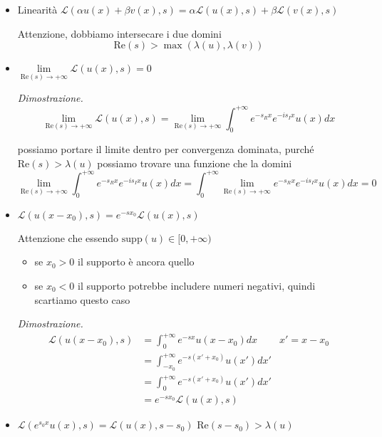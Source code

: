 \documentclass[10pt,a4paper,twoside]{book}
\begin{document}
\begin{itemize}
\item Linearità $\boxed{\mathcal{L}( \alpha u( x) +\beta v( x) ,s) =\alpha \mathcal{L}( u( x) ,s) +\beta \mathcal{L}( v( x) ,s)}$

Attenzione, dobbiamo intersecare i due domini\begin{equation*}
\boxed{\mathrm{Re}( s)  >\max( \lambda ( u) ,\lambda ( v))}
\end{equation*}
\item $\boxed{\lim\limits _{\mathrm{Re}( s)\rightarrow +\infty }\mathcal{L}( u( x) ,s) =0}$

\textit{Dimostrazione.}\begin{equation*}
\lim\limits _{\mathrm{Re}( s)\rightarrow +\infty }\mathcal{L}( u( x) ,s) =\lim\limits _{\mathrm{Re}( s)\rightarrow +\infty }\int ^{+\infty }_{0} e^{-s_{R} x} e^{-is_{I} x} u( x) dx
\end{equation*}

possiamo portare il limite dentro per convergenza dominata, purché $\mathrm{Re}( s)  >\lambda ( u)$ possiamo trovare una funzione che la domini\begin{equation*}
\lim\limits _{\mathrm{Re}( s)\rightarrow +\infty }\int ^{+\infty }_{0} e^{-s_{R} x} e^{-is_{I} x} u( x) dx=\int ^{+\infty }_{0}\lim\limits _{\mathrm{Re}( s)\rightarrow +\infty } e^{-s_{R} x} e^{-is_{I} x} u( x) dx=0
\end{equation*}
\item $\boxed{\mathcal{L}( u( x-x_{0}) ,s) =e^{-sx_{0}}\mathcal{L}( u( x) ,s)}$

Attenzione che essendo $\mathrm{supp}( u) \in [ 0,+\infty )$
\begin{itemize}
\item se $\boxed{x_{0}  >0}$ il supporto è ancora quello
\item se $x_{0} < 0$ il supporto potrebbe includere numeri negativi, quindi scartiamo questo caso
\end{itemize}

\textit{Dimostrazione.}\begin{equation*}
\begin{aligned}
\mathcal{L}( u( x-x_{0}) ,s) & =\int ^{+\infty }_{0} e^{-sx} u( x-x_{0}) dx & x'=x-x_{0}\\
 & =\int ^{+\infty }_{-x_{0}} e^{-s( x'+x_{0})} u( x') dx' & \\
 & =\int ^{+\infty }_{0} e^{-s( x'+x_{0})} u( x') dx' & \\
 & =e^{-sx_{0}}\mathcal{L}( u( x) ,s) & 
\end{aligned}
\end{equation*}
\item $\boxed{\mathcal{L}\left( e^{s_{0} x} u( x) ,s\right) =\mathcal{L}( u( x) ,s-s_{0})}$ $\boxed{\mathrm{Re}( s-s_{0})  >\lambda ( u)}$


\end{itemize}
\end{document}
